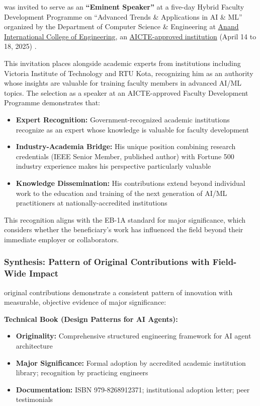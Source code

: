 \dr was invited to serve as an \textbf{``Eminent Speaker''} at a five-day Hybrid Faculty Development Programme on ``Advanced Trends \& Applications in AI \& ML'' organized by the Department of Computer Science \& Engineering at \underline{Anand International College of Engineering}, an \underline{AICTE-approved institution} (April 14 to 18, 2025) \cite{OR4}.

This invitation places \dr alongside academic experts from institutions including Victoria Institute of Technology and RTU Kota, recognizing him as an authority whose insights are valuable for training faculty members in advanced AI/ML topics. The selection as a speaker at an AICTE-approved Faculty Development Programme demonstrates that:

\begin{itemize}
    \item \textbf{Expert Recognition:} Government-recognized academic institutions recognize \dr as an expert whose knowledge is valuable for faculty development
    \item \textbf{Industry-Academia Bridge:} His unique position combining research credentials (IEEE Senior Member, published author) with Fortune 500 industry experience makes his perspective particularly valuable
    \item \textbf{Knowledge Dissemination:} His contributions extend beyond individual work to the education and training of the next generation of AI/ML practitioners at nationally-accredited institutions
\end{itemize}

This recognition aligns with the EB-1A standard for major significance, which considers whether the beneficiary's work has influenced the field beyond their immediate employer or collaborators.


\subsubsection{Synthesis: Pattern of Original Contributions with Field-Wide Impact}
\label{original:synthesis}

\drs original contributions demonstrate a consistent pattern of innovation with measurable, objective evidence of major significance:

\textbf{Technical Book (Design Patterns for AI Agents):}
\begin{itemize}
    \item \textbf{Originality:} Comprehensive structured engineering framework for AI agent architecture
    \item \textbf{Major Significance:} Formal adoption by accredited academic institution library; recognition by practicing engineers
    \item \textbf{Documentation:} ISBN 979-8268912371; institutional adoption letter; peer testimonials
\end{itemize}

